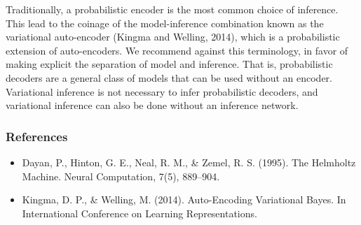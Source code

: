 Traditionally, a probabilistic encoder is the most common
choice of inference. This lead to the coinage of the model-inference
combination known as the variational auto-encoder
(Kingma and Welling, 2014), which is a probabilistic extension of
auto-encoders.
We recommend against this terminology,
in favor of making explicit the separation of model and inference.
That is, probabilistic decoders are a general class of
models that can be used without an encoder.
Variational
inference is not necessary to infer probabilistic decoders, and
variational inference can also be done without an inference network.

\subsubsection{References}\label{references}

\begin{itemize}
\item
  Dayan, P., Hinton, G. E., Neal, R. M., & Zemel, R. S. (1995). The Helmholtz Machine. Neural Computation, 7(5), 889–904.
\item
  Kingma, D. P., & Welling, M. (2014). Auto-Encoding Variational Bayes. In International Conference on Learning Representations.
\end{itemize}
